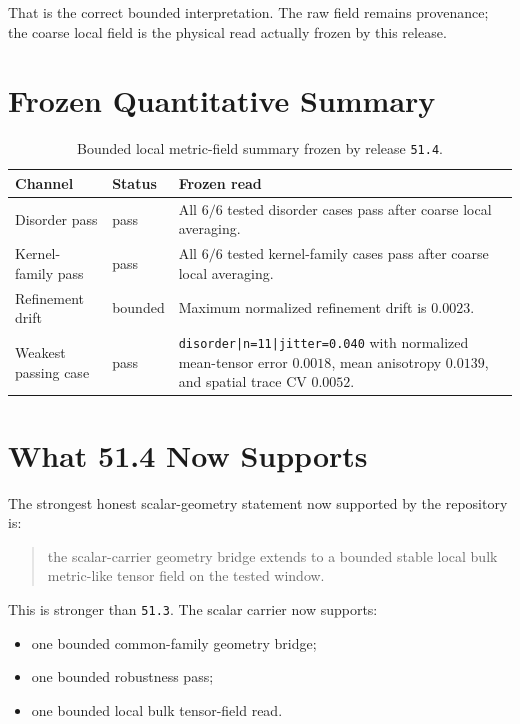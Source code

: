 \documentclass[11pt]{article}
\begin{document}
That is the correct bounded interpretation. The raw field remains provenance; the coarse local field is the physical read actually frozen by this release.

\section{Frozen Quantitative Summary}

\begin{table}[h!]
\centering
\begin{tabular}{@{}p{3.9cm}p{2.0cm}p{7.8cm}@{}}
\toprule
Channel & Status & Frozen read \\
\midrule
Disorder pass & pass & All \(6/6\) tested disorder cases pass after coarse local averaging. \\
Kernel-family pass & pass & All \(6/6\) tested kernel-family cases pass after coarse local averaging. \\
Refinement drift & bounded & Maximum normalized refinement drift is \(0.0023\). \\
Weakest passing case & pass & \texttt{disorder|n=11|jitter=0.040} with normalized mean-tensor error \(0.0018\), mean anisotropy \(0.0139\), and spatial trace CV \(0.0052\). \\
\bottomrule
\end{tabular}
\caption{Bounded local metric-field summary frozen by release \texttt{51.4}.}
\end{table}

\section{What 51.4 Now Supports}

The strongest honest scalar-geometry statement now supported by the repository is:

\begin{quote}
the scalar-carrier geometry bridge extends to a bounded stable local bulk metric-like tensor field on the tested window.
\end{quote}

This is stronger than \texttt{51.3}. The scalar carrier now supports:
\begin{itemize}
\item one bounded common-family geometry bridge;
\item one bounded robustness pass;
\item one bounded local bulk tensor-field read.
\end{itemize}
\end{document}
